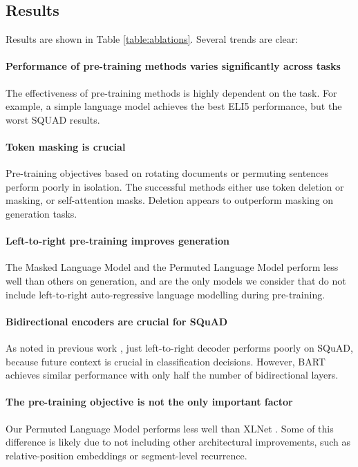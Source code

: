 \documentclass{article} %
\begin{document}
\subsection{Results}
Results are shown in Table \ref{table:ablations}. Several trends are clear:

\paragraph{Performance of pre-training methods varies significantly across tasks} The effectiveness of pre-training methods is highly dependent on the task. For example, a simple language model achieves the best ELI5 performance, but the worst SQUAD results.

\paragraph{Token masking is crucial} Pre-training objectives based on rotating documents or permuting sentences perform poorly in isolation. The successful methods either use token deletion or masking, or self-attention masks. Deletion appears to outperform masking on generation tasks.

\paragraph{Left-to-right pre-training improves generation} The Masked Language Model and the Permuted Language Model perform less well than others on generation, and are the only models we consider that do not include left-to-right auto-regressive language modelling during pre-training.

\paragraph{Bidirectional encoders are crucial for SQuAD} As noted in previous work \cite{bert}, just left-to-right decoder performs poorly on SQuAD, because future context is crucial in classification decisions. However, BART achieves similar performance with only half the number of bidirectional layers.

\paragraph{The pre-training objective is not the only important factor} Our Permuted Language Model performs less well than XLNet \cite{xlnet}. Some of this difference is likely due to not including other architectural improvements, such as relative-position embeddings or segment-level recurrence. 
\end{document}
